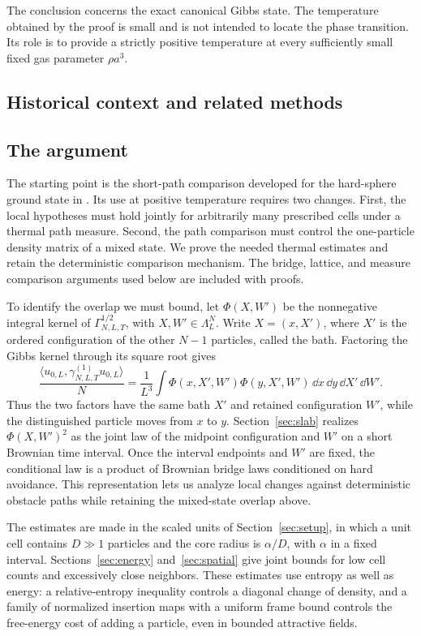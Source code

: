 The conclusion concerns the exact canonical Gibbs state. The temperature
obtained by the proof is small and is not intended to locate the phase
transition. Its role is to provide a strictly positive temperature at
every sufficiently small fixed gas parameter $\rho a^3$.

\subsection{Historical context and related methods}


\subsection{The argument}

The starting point is the short-path comparison developed for the
hard-sphere ground state in \citet{HS}. Its use at positive temperature
requires two changes. First, the local hypotheses must hold jointly for
arbitrarily many prescribed cells under a thermal path measure. Second,
the path comparison must control the one-particle density matrix of a
mixed state. We prove the needed thermal estimates and retain the
deterministic comparison mechanism. The bridge, lattice, and measure
comparison arguments used below are included with proofs.

To identify the overlap we must bound, let $\Phi(X,W')$ be the
nonnegative integral kernel of $\Gamma_{N,L,T}^{1/2}$, with
$X,W'\in\Lambda_L^N$. Write $X=(x,X')$, where $X'$ is the ordered
configuration of the other $N-1$ particles, called the bath. Factoring
the Gibbs kernel through its square root gives
\[
 \frac{\langle u_{0,L},\gamma^{(1)}_{N,L,T}u_{0,L}\rangle}{N}
 =\frac1{L^3}\int
 \Phi(x,X',W')\Phi(y,X',W')\,
 \dd x\,\dd y\,\dd X'\,\dd W'.
\]
Thus the two factors have the same bath $X'$ and retained configuration
$W'$, while the distinguished particle moves from $x$ to $y$.
Section~\ref{sec:slab} realizes $\Phi(X,W')^2$ as the joint law of
the midpoint configuration and $W'$ on a short Brownian time interval.
Once the interval endpoints and $W'$ are fixed, the conditional law is a
product of Brownian bridge laws conditioned on hard avoidance. This representation lets
us analyze local changes against deterministic obstacle paths while
retaining the mixed-state overlap above.

The estimates are made in the scaled units of Section~\ref{sec:setup},
in which a unit cell contains $D\gg1$ particles and the core radius is
$\alpha/D$, with $\alpha$ in a fixed interval.
Sections~\ref{sec:energy} and~\ref{sec:spatial} give joint bounds for
low cell counts and excessively close neighbors. These estimates use
entropy as well as energy: a relative-entropy inequality controls a
diagonal change of density, and a family of normalized insertion maps
with a uniform frame bound controls the free-energy cost of adding a
particle, even in bounded attractive fields.

